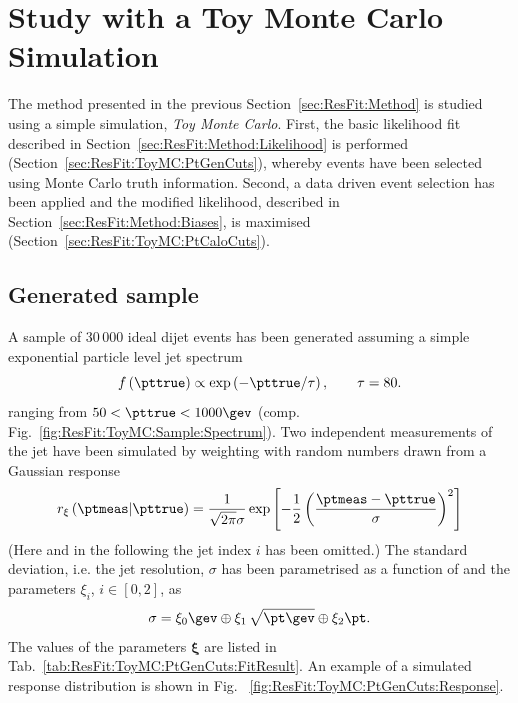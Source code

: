 

\section{Study with a Toy Monte Carlo Simulation}\label{sec:ResFit:ToyMC}

The method presented in the previous Section~\ref{sec:ResFit:Method}
is studied using a simple simulation, \textit{Toy Monte Carlo}.
First, the basic likelihood fit described in
Section~\ref{sec:ResFit:Method:Likelihood} is performed (Section~\ref{sec:ResFit:ToyMC:PtGenCuts}),
whereby events have been selected using Monte Carlo truth information.
Second, a data driven event selection has been applied and the
modified likelihood, described in
Section~\ref{sec:ResFit:Method:Biases}, is maximised (Section~\ref{sec:ResFit:ToyMC:PtCaloCuts}).


\subsection{Generated sample}\label{sec:ResFit:ToyMC:Sample}

A sample of $30\,000$ ideal dijet events has been generated assuming a
simple exponential particle level jet \pt spectrum
\begin{equation}
  \label{eq:ResFit:ToyMC:Spectrum}
  f\left(\pttrue\right) \propto \exp\left(-\pttrue / \tau\right),
  \qquad \tau = 80.
\end{equation}
ranging from \mbox{$50 < \pttrue < 1000\gev$} (comp. Fig.~\ref{fig:ResFit:ToyMC:Sample:Spectrum}).
Two independent measurements of the jet \pt have been simulated by
weighting \pttrue with random numbers drawn from a Gaussian response
\begin{equation}
  \label{eq:ResFit:ToyMC:Response}
  r_{\mathbf{\xi}}\left(\ptmeas|\pttrue\right) = 
  \frac{1}{\sqrt{2\pi}\sigma}\exp\left[-\frac{1}{2}\left(\frac{\ptmeas - \pttrue}{\sigma}\right)^{2}\right]
\end{equation}
(Here and in the following the jet index $i$ has been omitted.)
The standard deviation, i.e. the jet resolution, $\sigma$ has been parametrised as a function of \pttrue and
the parameters $\xi_{i}$, \mbox{$i\in [0,2]$}, as
\begin{equation}
  \label{eq:ResFit:ToyMC:Sigma}
  \sigma = \xi_{0}\gev
  \oplus \xi_{1}\,\sqrt{\pt\gev}\oplus \xi_{2}\pt.
\end{equation}
The values of the parameters $\mathbf{\xi}$ are listed in
Tab.~\ref{tab:ResFit:ToyMC:PtGenCuts:FitResult}.
An example of a simulated response distribution is shown in Fig. ~\ref{fig:ResFit:ToyMC:PtGenCuts:Response}.

